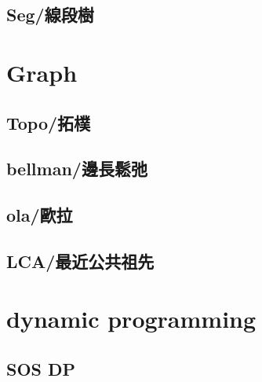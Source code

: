 \documentclass[a4paper,10pt,twocolumn,oneside]{article}
\begin{document}
    \subsection{Seg/線段樹}
    


\section{Graph}

    \subsection{Topo/拓樸}
    

    \subsection{bellman/邊長鬆弛}
    

    \subsection{ola/歐拉}
    

    \subsection{LCA/最近公共祖先}
    


\section{dynamic programming}
    \subsection{SOS DP}
    


%     
\end{document}
